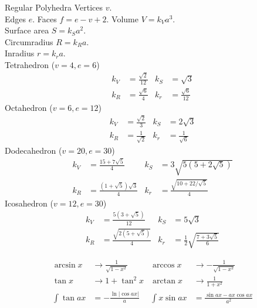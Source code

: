 \begin{algorithm}{Regular Polyhedra}
\desc
Vertices $v$.\\
Edges $e$.
Faces $f = e-v+2$.
Volume $V = k_V a^3$.\\
Surface area $S = k_S a^2$.\\
Circumradius $R = k_R a$.\\
Inradius $r = k_r a$.\\

Tetrahedron ($v = 4, e = 6$)
\begin{align*} 
  k_V &= \frac{\sqrt{2}}{12} & k_S &= \sqrt{3}\\
  k_R &= \frac{\sqrt{6}}{4}    & k_r &= \frac{\sqrt{6}}{12}
\end{align*}
Octahedron ($v = 6, e = 12$)
\begin{align*} 
  k_V &= \frac{\sqrt{2}}{3} & k_S &= 2\sqrt{3}\\
  k_R &= \frac{1}{\sqrt{2}}    & k_r &= \frac{1}{\sqrt{6}}
\end{align*}
Dodecahedron ($v = 20, e = 30$)
\begin{align*} 
  k_V &= \frac{15 + 7\sqrt{5}}{4} & k_S &= 3\sqrt{5(5+2\sqrt{5})}\\
  k_R &= \frac{(1+\sqrt{5})\sqrt{3}}{4} & k_r &= \frac{\sqrt{10 + 22/\sqrt{5}}}{4}
\end{align*}
Icosahedron ($v = 12, e = 30$)
\begin{align*}
  k_V &= \frac{5(3 + \sqrt{5})}{12} & k_S &= 5\sqrt{3}\\
  k_R &= \frac{\sqrt{2(5+\sqrt{5})}}{4} & k_r &= \frac{1}{2}\sqrt{\frac{7+3\sqrt{5}}{6}}
\end{align*}
\end{algorithm}


\begin{align*}
\arcsin x & \rightarrow \frac{1}{\sqrt{1-x^2}} & 
\arccos x & \rightarrow -\frac{1}{\sqrt{1-x^2}} \\
\tan x & \rightarrow 1 + \tan^2 x &
\arctan x & \rightarrow \frac{1}{1+x^2}\\
\int \tan ax & = - \frac{\ln | \cos ax |}{a} &
\int x \sin ax & = \frac{\sin ax - ax \cos ax}{a^2}
\end{align*}
  

